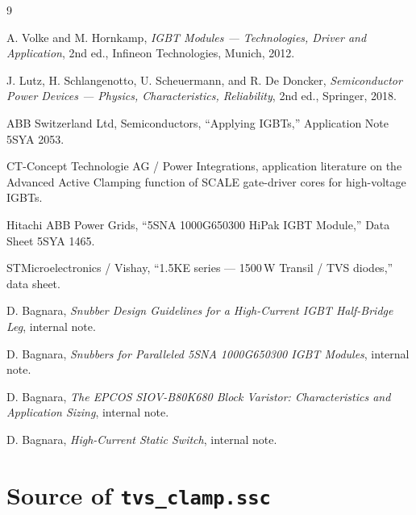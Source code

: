\documentclass[11pt,a4paper]{article}
\begin{document}
\begin{thebibliography}{9}

 A. Volke and M. Hornkamp, \emph{IGBT Modules ---
Technologies, Driver and Application}, 2nd ed., Infineon Technologies,
Munich, 2012.

 J. Lutz, H. Schlangenotto, U. Scheuermann, and
R. De Doncker, \emph{Semiconductor Power Devices --- Physics,
Characteristics, Reliability}, 2nd ed., Springer, 2018.

 ABB Switzerland Ltd, Semiconductors, ``Applying
IGBTs,'' Application Note 5SYA 2053.

 CT-Concept Technologie AG / Power Integrations,
application literature on the Advanced Active Clamping function of
SCALE gate-driver cores for high-voltage IGBTs.

 Hitachi ABB Power Grids, ``5SNA 1000G650300 HiPak IGBT
Module,'' Data Sheet 5SYA 1465.

 STMicroelectronics / Vishay, ``1.5KE series ---
1500\,W Transil / TVS diodes,'' data sheet.

 D. Bagnara, \emph{Snubber Design Guidelines for a
High-Current IGBT Half-Bridge Leg}, internal note.

 D. Bagnara, \emph{Snubbers for Paralleled 5SNA
1000G650300 IGBT Modules}, internal note.

 D. Bagnara, \emph{The EPCOS SIOV-B80K680 Block
Varistor: Characteristics and Application Sizing}, internal note.

 D. Bagnara, \emph{High-Current Static Switch},
internal note.

\end{thebibliography}

\appendix
\section{Source of \texttt{tvs\_clamp.ssc}}
\label{app:code}
\end{document}
